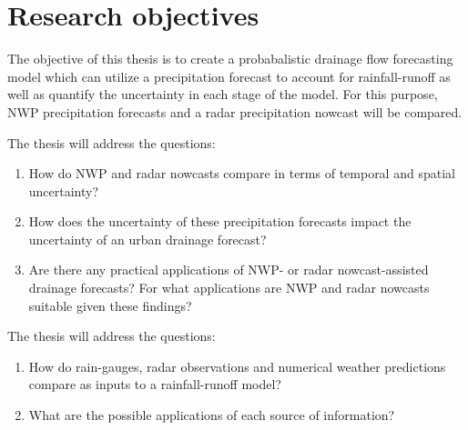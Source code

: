 

\section{Research objectives}
The objective of this thesis is to create a probabalistic drainage flow forecasting model which can utilize a precipitation forecast to account for rainfall-runoff as well as quantify the uncertainty in each stage of the model. For this purpose, NWP precipitation forecasts and a radar precipitation nowcast will be compared. 



The thesis will address the questions:

\begin{enumerate}
  \item How do NWP and radar nowcasts compare in terms of temporal and spatial uncertainty?
  \item How does the uncertainty of these precipitation forecasts impact the uncertainty of an urban drainage forecast?
  \item Are there any practical applications of NWP- or radar nowcast-assisted drainage forecasts? 
  For what applications are NWP and radar nowcasts suitable given these findings?
\end{enumerate}

The thesis will address the questions:
\begin{enumerate}
  \item How do rain-gauges, radar observations and numerical weather predictions compare as inputs to a rainfall-runoff model?
  \item What are the possible applications of each source of information?
\end{enumerate}

